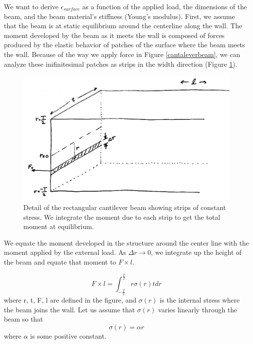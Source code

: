 We want to
derive $\epsilon_{surface}$	%
as a function of the applied
load, the dimensions of the beam, and the beam material's stiffness
(Young's modulus).  First, we assume that the beam is at static
equilibrium around the centerline along the wall.
The moment developed by the beam as it meets the wall is composed of forces produced by the elastic behavior of patches of the surface where the beam meets the wall.  Because of the way we apply force in Figure \ref{cantaleverbeam}, we can analyze these inifinitesimal patches as strips in the width direction (Figure \ref{cantaleverdetail}).

\begin{figure}	%
\begin{center}
\includegraphics[width=5.0in]{figs10/00886.eps}
\caption{ Detail of the rectangular cantilever beam showing strips of constant stress. We integrate the moment due to each strip to get the total moment at equilibrium.}\label{cantaleverdetail}
\end{center}
\end{figure}	%

We equate the moment developed in the structure around the center line with the moment applied
by the external load.   As $\Delta r \to 0$, we integrate up the height of the beam and equate that moment to $F\times l$.

\[
F\times l = \int^{\frac{T}{2}}_{-\frac{T}{2}} r \sigma(r) t dr
\]
where r, t, F, l are defined in the figure, and $\sigma(r)$ is
the internal stress where the beam joins the wall.
Let us assume that $\sigma(r)$ varies linearly through the beam so
that
\[
\sigma(r)= \alpha r
\]
where $\alpha$ is some positive constant.



